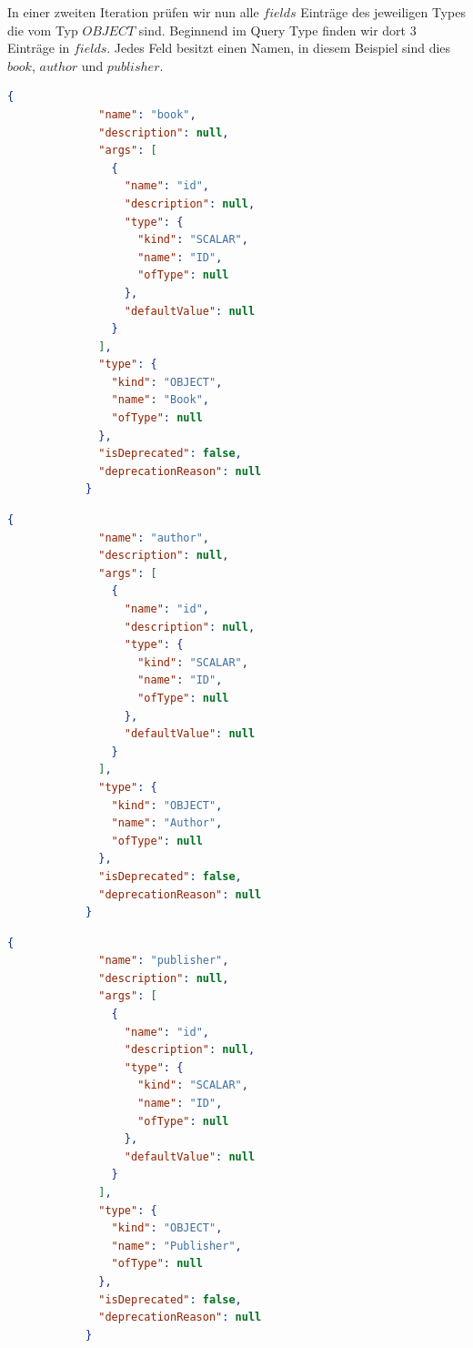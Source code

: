 
In einer zweiten Iteration prüfen wir nun alle $fields$ Einträge des jeweiligen Types die vom Typ $OBJECT$ sind.
Beginnend im Query Type finden wir dort 3 Einträge in $fields$.
Jedes Feld besitzt einen Namen, in diesem Beispiel sind dies $book$, $author$ und $publisher$.

\begin{lstlisting}[language=json, caption={book Field},captionpos=b]
            {
              "name": "book",
              "description": null,
              "args": [
                {
                  "name": "id",
                  "description": null,
                  "type": {
                    "kind": "SCALAR",
                    "name": "ID",
                    "ofType": null
                  },
                  "defaultValue": null
                }
              ],
              "type": {
                "kind": "OBJECT",
                "name": "Book",
                "ofType": null
              },
              "isDeprecated": false,
              "deprecationReason": null
            }
\end{lstlisting}

\begin{lstlisting}[language=json, caption={author Field},captionpos=b]
            {
              "name": "author",
              "description": null,
              "args": [
                {
                  "name": "id",
                  "description": null,
                  "type": {
                    "kind": "SCALAR",
                    "name": "ID",
                    "ofType": null
                  },
                  "defaultValue": null
                }
              ],
              "type": {
                "kind": "OBJECT",
                "name": "Author",
                "ofType": null
              },
              "isDeprecated": false,
              "deprecationReason": null
            }
\end{lstlisting}

\begin{lstlisting}[language=json, caption={publisher Field},captionpos=b]
            {
              "name": "publisher",
              "description": null,
              "args": [
                {
                  "name": "id",
                  "description": null,
                  "type": {
                    "kind": "SCALAR",
                    "name": "ID",
                    "ofType": null
                  },
                  "defaultValue": null
                }
              ],
              "type": {
                "kind": "OBJECT",
                "name": "Publisher",
                "ofType": null
              },
              "isDeprecated": false,
              "deprecationReason": null
            }
\end{lstlisting}

